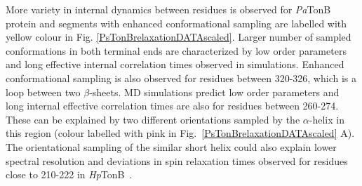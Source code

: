 \documentclass[pre,aps,floatfix,authordate1-4,twocolumn]{revtex4-1}
\begin{document}
More variety in internal dynamics between residues is observed for {\it Pa}TonB
protein
and segments with enhanced conformational sampling are labelled with yellow colour
in Fig. \ref{PsTonBrelaxationDATAscaled}.
Larger number of sampled conformations in both terminal ends
are characterized by low order parameters and long effective internal correlation times
observed in simulations. 
Enhanced conformational sampling is also observed for residues between 320-326,
which is a loop between two $\beta$-sheets.
MD simulations predict low order parameters and long internal effective correlation
times are also for residues between 260-274. These can be explained by  
two different orientations sampled by the $\alpha$-helix in this region
(colour labelled with pink in Fig.~\ref{PsTonBrelaxationDATAscaled} A).
The orientational sampling of the similar short helix could also explain 
lower spectral resolution and deviations in spin relaxation times
observed for residues close to 210-222 in {\it Hp}TonB~\cite{ciragan16}.
\end{document}
